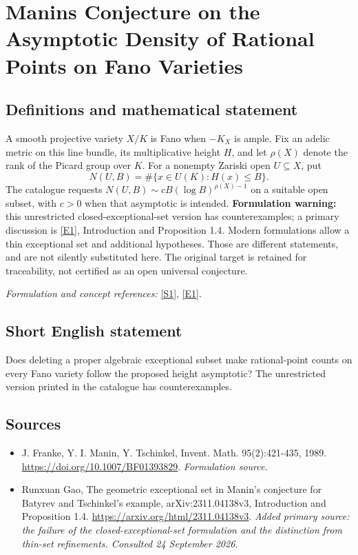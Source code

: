 \documentclass[11pt]{article}
\begin{document}
\section*{\texorpdfstring{Manins Conjecture on the Asymptotic Density of Rational Points on Fano Varieties}{Manins Conjecture on the Asymptotic Density of Rational Points on Fano Varieties}}\label{30006760}
\subsection{Definitions and mathematical statement}
A smooth projective variety $X/K$ is Fano when $-K_X$ is ample. Fix an adelic metric on this line bundle, its multiplicative height $H$, and let $\rho(X)$ denote the rank of the Picard group over $K$. For a nonempty Zariski open $U\subseteq X$, put
\[
 N(U,B)=\#\{x\in U(K):H(x)\le B\}.
\]
The catalogue requests $N(U,B)\sim cB(\log B)^{\rho(X)-1}$ on a suitable open subset, with $c>0$ when that asymptotic is intended. \textbf{Formulation warning:} this unrestricted closed-exceptional-set version has counterexamples; a primary discussion is \href{https://arxiv.org/html/2311.04138v3}{[E1]}, Introduction and Proposition 1.4. Modern formulations allow a thin exceptional set and additional hypotheses. Those are different statements, and are not silently substituted here. The original target is retained for traceability, not certified as an open universal conjecture.
\par\smallskip\textit{Formulation and concept references:} \href{https://doi.org/10.1007/BF01393829}{[S1]}, \href{https://arxiv.org/html/2311.04138v3}{[E1]}.

\subsection{Short English statement}
Does deleting a proper algebraic exceptional subset make rational-point counts on every Fano variety follow the proposed height asymptotic? The unrestricted version printed in the catalogue has counterexamples.
\subsection{Sources}
\begin{itemize}
\item[S1]J. Franke, Y. I. Manin, Y. Tschinkel, Invent. Math. 95(2):421-435, 1989.
\url{https://doi.org/10.1007/BF01393829}.
\textit{Formulation source.}
\item[E1]Runxuan Gao, The geometric exceptional set in Manin's conjecture for Batyrev and Tschinkel's example, arXiv:2311.04138v3, Introduction and Proposition 1.4.
\url{https://arxiv.org/html/2311.04138v3}.
\textit{Added primary source: the failure of the closed-exceptional-set formulation and the distinction from thin-set refinements. Consulted 24 September 2026.}
\end{itemize}
\end{document}
